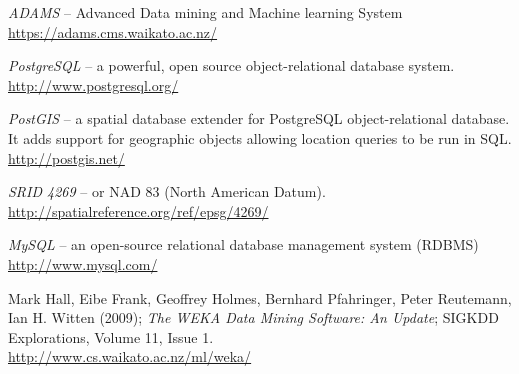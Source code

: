 %

\begin{thebibliography}{999}

		\textit{ADAMS} -- Advanced Data mining and Machine learning System \\
		\url{https://adams.cms.waikato.ac.nz/}{}

	 	\textit{PostgreSQL} -- a powerful, open source object-relational
	 	database system. \\
		\url{http://www.postgresql.org/}{}

		\textit{PostGIS} -- a spatial database extender for PostgreSQL
		object-relational database. It adds support for geographic
		objects allowing location queries to be run in SQL.  \\
		\url{http://postgis.net/}{}

	 	\textit{SRID 4269} -- or NAD 83 (North American Datum). \\
		\url{http://spatialreference.org/ref/epsg/4269/}{}

		\textit{MySQL} -- an open-source relational database management
		system (RDBMS) \\
		\url{http://www.mysql.com/}{}

	 	Mark Hall, Eibe Frank, Geoffrey Holmes, Bernhard Pfahringer, Peter
	 	Reutemann, Ian H. Witten (2009); \textit{The WEKA Data Mining Software: An
	 	Update}; SIGKDD Explorations, Volume 11, Issue 1. \\
		\url{http://www.cs.waikato.ac.nz/ml/weka/}{}

\end{thebibliography}
